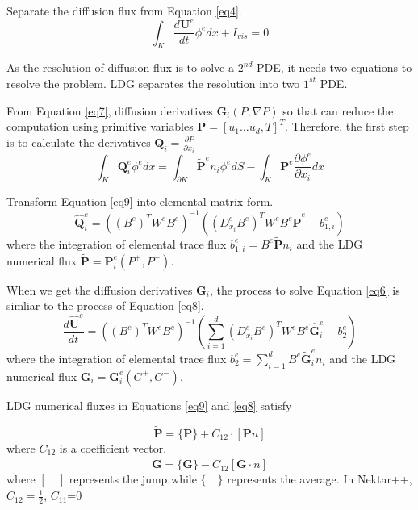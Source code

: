 Separate the diffusion flux from Equation \eqref{eq4}.
\begin{equation}\label{eq6}
\int_{K}{\frac{d \textbf{U}^{e}}{d t}\phi^{e} dx}+I_{vis}=0
\end{equation}

As the resolution of diffusion flux is to solve a $2^{nd}$ PDE, it needs two equations to resolve the problem. LDG separates the resolution into two $1^{st}$ PDE.

From Equation \eqref{eq7}, diffusion derivatives $\textbf{G}_{i}(P,\nabla P)$ so that can reduce the computation using primitive variables $\textbf{P}=[u_{1}\hdots u_{d}, T]^{T}$. Therefore, the first step is to calculate the derivatives $\textbf{Q}_{i}=\frac{\partial P}{\partial x_{i}}$
\begin{equation}\label{eq9}
\int_{K}{\textbf{Q}^{e}_{i} \phi^{e} dx}=
{\int_{\partial K}{\widetilde{\textbf{P}}^{e}n_{i}\phi^{e}}dS}-
\int_{K}{\textbf{P}^{e}\frac{\partial \phi^{e}}{\partial x_{i}}dx}
\end{equation}

Transform Equation \eqref{eq9} into elemental matrix form.
\begin{equation}\label{eq10}
\hat{\textbf{Q}}_{i}^{e}
=((B^{e})^{T}W^{e}B^{e})^{-1}
((D^{e}_{x_{i}} B^{e})^{T}W^{e}B^{e}\hat{\textbf{P}}^{e}-
b_{1,i}^{e})
\end{equation}
where the integration of elemental trace flux $b_{1,i}^{e}=B^{e}\widetilde{\textbf{P}}n_{i}$ and the LDG numerical flux $\widetilde{\textbf{P}}=\textbf{P}^{e}_{i}(P^{+},P^{-})$.

When we get the diffusion derivatives $\textbf{G}_{i}$, the process to solve Equation \eqref{eq6} is simliar to the process of Equation \eqref{eq8}.
\begin{equation}\label{eq8}
\frac{d \hat{\textbf{U}}^{e}}{d t}
=((B^{e})^{T}W^{e}B^{e})^{-1}(\sum\limits_{i=1}^{d}{(D^{e}_{x_{i}} B^{e})^{T}}W^{e}B^{e}\hat{\textbf{G}}^{e}_{i}-
b_{2}^{e})
\end{equation}
where the integration of elemental trace flux $b_{2}^{e}=\sum\limits_{i=1}^{d}{B^{e}\widetilde{\textbf{G}}^{e}_{i}}n_{i}$ and the LDG numerical flux $\widetilde{\textbf{G}_{i}}=\textbf{G}^{e}_{i}(G^{+},G^{-})$.

LDG numerical fluxes in Equations \eqref{eq9} and \eqref{eq8} satisfy

\begin{equation}
\tilde{\textbf{P}}=\{\textbf{P}\}+C_{12}\cdot [\textbf{P} n]
\end{equation}
where $C_{12}$ is a coefficient vector.
\begin{equation}
\tilde{\textbf{G}}=\{\textbf{G}\}-C_{12} [\textbf{G} \cdot n]
\end{equation}
where $[\quad]$ represents the jump while $\{\quad \}$ represents the average. In Nektar++, $C_{12}=\frac{1}{2}$, $C_{11}$=0


